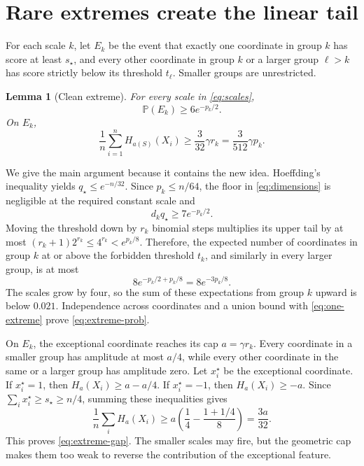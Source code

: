 \documentclass{article}
\newtheorem{lemma}[theorem]{Lemma}
\newcommand{\Pp}{\mathbb P}
\newcommand{\1}{\mathbf 1}
\begin{document}
\section{Rare extremes create the linear tail}

For each scale $k$, let $E_k$ be the event that exactly one coordinate in group $k$ has score at least $s_\star$, and every other coordinate in group $k$ or a larger group $\ell>k$ has score strictly below its threshold $t_\ell$. Smaller groups are unrestricted.

\begin{lemma}[Clean extreme]\label{lem:extreme}
For every scale in \eqref{eq:scales},
\begin{equation}
 \Pp(E_k)\ge6e^{-p_k/2}.
 \label{eq:extreme-prob}
\end{equation}
On $E_k$,
\begin{equation}
 \frac1n\sum_{i=1}^nH_{a(S)}(X_i)
 \ge \frac{3}{32}\gamma r_k
 =\frac{3}{512}\gamma p_k.
 \label{eq:extreme-gap}
\end{equation}
\end{lemma}

We give the main argument because it contains the new idea. Hoeffding's inequality yields $q_\star\le e^{-n/32}$. Since $p_k\le n/64$, the floor in \eqref{eq:dimensions} is negligible at the required constant scale and
\begin{equation}
 d_kq_\star\ge7e^{-p_k/2}.
 \label{eq:one-extreme}
\end{equation}
Moving the threshold down by $r_k$ binomial steps multiplies its upper tail by at most $(r_k+1)2^{r_k}\le4^{r_k}<e^{p_k/8}$. Therefore, the expected number of coordinates in group $k$ at or above the forbidden threshold $t_k$, and similarly in every larger group, is at most
\begin{equation}
 8e^{-p_k/2+p_k/8}=8e^{-3p_k/8}.
 \label{eq:active-count}
\end{equation}
The scales grow by four, so the sum of these expectations from group $k$ upward is below $0.021$. Independence across coordinates and a union bound with \eqref{eq:one-extreme} prove \eqref{eq:extreme-prob}.

On $E_k$, the exceptional coordinate reaches its cap $a=\gamma r_k$. Every coordinate in a smaller group has amplitude at most $a/4$, while every other coordinate in the same or a larger group has amplitude zero. Let $x_i^\star$ be the exceptional coordinate. If $x_i^\star=1$, then $H_a(X_i)\ge a-a/4$. If $x_i^\star=-1$, then $H_a(X_i)\ge-a$. Since $\sum_ix_i^\star\ge s_\star\ge n/4$, summing these inequalities gives \[ \frac1n\sum_iH_a(X_i) \ge a\left(\frac14-\frac{1+1/4}{8}\right)=\frac{3a}{32}. \] This proves \eqref{eq:extreme-gap}. The smaller scales may fire, but the geometric cap makes them too weak to reverse the contribution of the exceptional feature.
\end{document}
